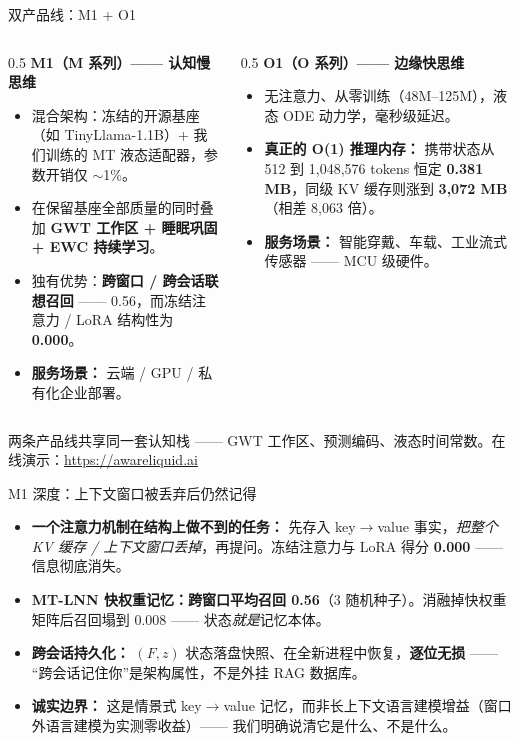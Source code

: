 \documentclass[aspectratio=169, 10pt]{beamer}
\begin{document}
\begin{frame}{双产品线：M1 + O1}
\small
\begin{columns}[T]
\begin{column}{0.5\textwidth}
\textbf{M1（M 系列）—— 认知慢思维}
\begin{itemize}\itemsep=0.3em
    \item 混合架构：冻结的开源基座（如 TinyLlama-1.1B）+ 我们训练的 MT 液态适配器，参数开销仅 $\sim$1\%。
    \item 在保留基座全部质量的同时叠加 \textbf{GWT 工作区 + 睡眠巩固 + EWC 持续学习}。
    \item 独有优势：\textbf{跨窗口 / 跨会话联想召回} —— 0.56，而冻结注意力 / LoRA 结构性为 \textbf{0.000}。
    \item \textbf{服务场景：} 云端 / GPU / 私有化企业部署。
\end{itemize}
\end{column}
\begin{column}{0.5\textwidth}
\textbf{O1（O 系列）—— 边缘快思维}
\begin{itemize}\itemsep=0.3em
    \item 无注意力、从零训练（48M--125M），液态 ODE 动力学，毫秒级延迟。
    \item \textbf{真正的 O(1) 推理内存：} 携带状态从 512 到 1{,}048{,}576 tokens 恒定 \textbf{0.381 MB}，同级 KV 缓存则涨到 \textbf{3{,}072 MB}（相差 8{,}063 倍）。
    \item \textbf{服务场景：} 智能穿戴、车载、工业流式传感器 —— MCU 级硬件。
\end{itemize}
\end{column}
\end{columns}
\vspace{0.4em}
{\footnotesize 两条产品线共享同一套认知栈 —— GWT 工作区、预测编码、液态时间常数。在线演示：\url{https://awareliquid.ai}}
\end{frame}

\begin{frame}{M1 深度：上下文窗口被丢弃后仍然记得}
\begin{itemize}
    \item \textbf{一个注意力机制在结构上做不到的任务：} 先存入 key$\to$value 事实，\emph{把整个 KV 缓存 / 上下文窗口丢掉}，再提问。冻结注意力与 LoRA 得分 \textbf{0.000} —— 信息彻底消失。
    \item \textbf{MT-LNN 快权重记忆：跨窗口平均召回 0.56}（3 随机种子）。消融掉快权重矩阵后召回塌到 0.008 —— 状态\emph{就是}记忆本体。
    \item \textbf{跨会话持久化：} $(F, z)$ 状态落盘快照、在全新进程中恢复，\textbf{逐位无损} —— “跨会话记住你”是架构属性，不是外挂 RAG 数据库。
    \item \textbf{诚实边界：} 这是情景式 key$\to$value 记忆，而非长上下文语言建模增益（窗口外语言建模为实测零收益）—— 我们明确说清它是什么、不是什么。
\end{itemize}
\end{frame}
\end{document}
